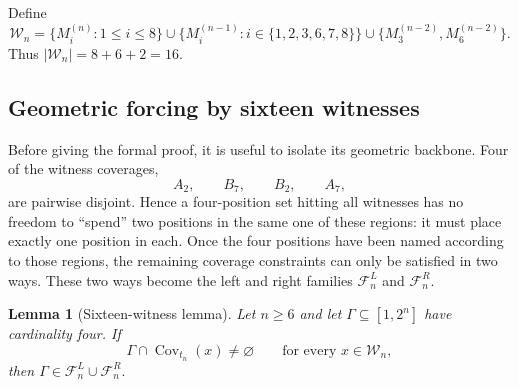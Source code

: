 \documentclass[10pt,a4paper]{article}
\newtheorem{lemma}[theorem]{Lemma}
\theoremstyle{definition}\newtheorem{definition}[theorem]{Definition}
\theoremstyle{remark}\newtheorem{remark}[theorem]{Remark}
\newcommand{\Cov}{\operatorname{Cov}}
\newcommand{\FL}{\mathcal{F}^{L}}
\newcommand{\FR}{\mathcal{F}^{R}}
\begin{document}
Define
\[
\mathcal W_n=
\{M_i^{(n)}:1\le i\le8\}
\cup
\{M_i^{(n-1)}:i\in\{1,2,3,6,7,8\}\}
\cup
\{M_3^{(n-2)},M_6^{(n-2)}\}.
\]
Thus $|\mathcal W_n|=8+6+2=16$.

\subsection{Geometric forcing by sixteen witnesses}
\label{subsec:sixteen-witness}

Before giving the formal proof, it is useful to isolate its geometric backbone.  Four of the witness coverages,
\[
 A_2,\qquad B_7,\qquad B_2,\qquad A_7,
\]
are pairwise disjoint.  Hence a four-position set hitting all witnesses has no freedom to ``spend'' two positions in the same one of these regions: it must place exactly one position in each.  Once the four positions have been named according to those regions, the remaining coverage constraints can only be satisfied in two ways.  These two ways become the left and right families $\FL_n$ and $\FR_n$.

\begin{lemma}[Sixteen-witness lemma]
\label{lem:sixteen-witness}
Let $n\ge6$ and let $\Gamma\subseteq[1,2^n]$ have cardinality four.  If
\[
 \Gamma\cap\Cov_{t_n}(x)\ne\varnothing
 \qquad\text{for every }x\in\mathcal W_n,
\]
then
$
 \Gamma\in\FL_n\cup\FR_n.
$
\end{lemma}
\end{document}

